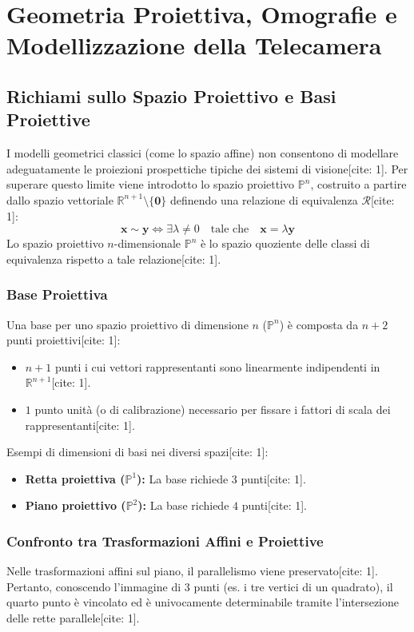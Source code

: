 \chapter{Geometria Proiettiva, Omografie e Modellizzazione della Telecamera}

\section{Richiami sullo Spazio Proiettivo e Basi Proiettive}
I modelli geometrici classici (come lo spazio affine) non consentono di modellare adeguatamente le proiezioni prospettiche tipiche dei sistemi di visione[cite: 1]. Per superare questo limite viene introdotto lo spazio proiettivo $\mathbb{P}^n$, costruito a partire dallo spazio vettoriale $\mathbb{R}^{n+1} \setminus \{\mathbf{0}\}$ definendo una relazione di equivalenza $\mathcal{R}$[cite: 1]:
\begin{equation}
\mathbf{x} \sim \mathbf{y} \iff \exists \lambda \neq 0 \quad \text{tale che} \quad \mathbf{x} = \lambda \mathbf{y}
\end{equation}
Lo spazio proiettivo $n$-dimensionale $\mathbb{P}^n$ è lo spazio quoziente delle classi di equivalenza rispetto a tale relazione[cite: 1].

\subsection{Base Proiettiva}
Una base per uno spazio proiettivo di dimensione $n$ ($\mathbb{P}^n$) è composta da $n+2$ punti proiettivi[cite: 1]:
\begin{itemize}
    \item $n+1$ punti i cui vettori rappresentanti sono linearmente indipendenti in $\mathbb{R}^{n+1}$[cite: 1].
    \item $1$ punto unità (o di calibrazione) necessario per fissare i fattori di scala dei rappresentanti[cite: 1].
\end{itemize}

Esempi di dimensioni di basi nei diversi spazi[cite: 1]:
\begin{itemize}
    \item \textbf{Retta proiettiva ($\mathbb{P}^1$):} La base richiede $3$ punti[cite: 1].
    \item \textbf{Piano proiettivo ($\mathbb{P}^2$):} La base richiede $4$ punti[cite: 1].
\end{itemize}

\subsection{Confronto tra Trasformazioni Affini e Proiettive}
Nelle trasformazioni affini sul piano, il parallelismo viene preservato[cite: 1]. Pertanto, conoscendo l'immagine di $3$ punti (es. i tre vertici di un quadrato), il quarto punto è vincolato ed è univocamente determinabile tramite l'intersezione delle rette parallele[cite: 1].

